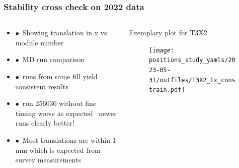 \documentclass[aspectratio=1610, 12pt, xcolor=dvipsnames]{beamer}
\begin{document}
\begin{frame}\frametitle{Stability cross check on 2022 data}
  \begin{columns}
    \begin{column}[c]{0.48\textwidth}
      \begin{itemize}
	      \item $\bullet$\, Showing translation in x vs module number
	      \item $\bullet$\, MD run comparison
	      \item $\bullet$\, runs from same fill yield consistent results
	      \item $\bullet$\, run 256030 without fine timing worse as expected \to\, newer runs clearly better!
	      \item $\bullet$\, Most translations are within 1 mm which is expected from survey measurements
      \end{itemize}
    \end{column}
    \begin{column}[c]{0.48\textwidth}
      Exemplary plot for T3X2
      \begin{figure}
      	\texttt{[image: positions\_study\_yamls/2023-05-31/outfiles/T3X2\_Tx\_constrain.pdf]}
      \end{figure}
    \end{column}
  \end{columns}
\end{frame}
\end{document}
